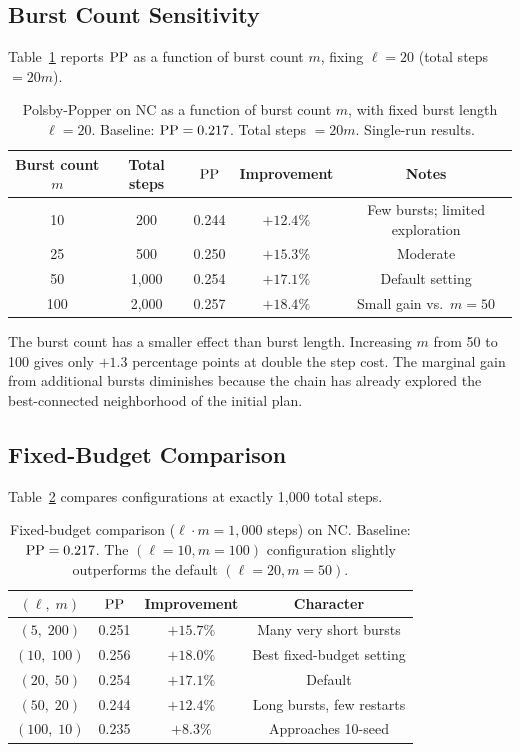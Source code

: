 \subsection{Burst Count Sensitivity}

Table~\ref{tab:burst-count} reports $\mathrm{PP}$ as a function of burst count
$m$, fixing $\ell = 20$ (total steps $= 20m$).

\begin{table}[h]
\centering
\caption{Polsby-Popper on NC as a function of burst count $m$,
         with fixed burst length $\ell = 20$. Baseline: $\mathrm{PP} = 0.217$.
         Total steps $= 20m$. Single-run results.}
\label{tab:burst-count}
\begin{tabular}{ccccc}
\toprule
Burst count $m$ & Total steps & $\mathrm{PP}$ & Improvement & Notes \\
\midrule
10  &   200 & 0.244 & $+12.4\%$ & Few bursts; limited exploration \\
25  &   500 & 0.250 & $+15.3\%$ & Moderate \\
50  & 1{,}000 & 0.254 & $+17.1\%$ & Default setting \\
100 & 2{,}000 & 0.257 & $+18.4\%$ & Small gain vs.\ $m=50$ \\
\bottomrule
\end{tabular}
\end{table}

The burst count has a smaller effect than burst length.
Increasing $m$ from 50 to 100 gives only $+1.3$ percentage points
at double the step cost.
The marginal gain from additional bursts diminishes because the chain
has already explored the best-connected neighborhood of the initial plan.

\subsection{Fixed-Budget Comparison}

Table~\ref{tab:fixed-budget} compares configurations at exactly 1{,}000
total steps.

\begin{table}[h]
\centering
\caption{Fixed-budget comparison ($\ell \cdot m = 1{,}000$ steps) on NC.
         Baseline: $\mathrm{PP} = 0.217$. The $(\ell=10, m=100)$ configuration
         slightly outperforms the default $(\ell=20, m=50)$.}
\label{tab:fixed-budget}
\begin{tabular}{cccc}
\toprule
$(\ell,\; m)$ & $\mathrm{PP}$ & Improvement & Character \\
\midrule
$(5,\; 200)$   & 0.251 & $+15.7\%$ & Many very short bursts \\
$(10,\; 100)$  & 0.256 & $+18.0\%$ & Best fixed-budget setting \\
$(20,\; 50)$   & 0.254 & $+17.1\%$ & Default \\
$(50,\; 20)$   & 0.244 & $+12.4\%$ & Long bursts, few restarts \\
$(100,\; 10)$  & 0.235 & $+8.3\%$  & Approaches 10-seed \cs{} \\
\bottomrule
\end{tabular}
\end{table}

